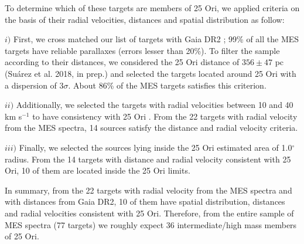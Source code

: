 \documentclass[12pt]{article}
\begin{document}
To determine which of these targets are members of 25 Ori, we applied criteria on the basis of their radial velocities, distances and spatial distribution as follow:

$i)$ First, we cross matched our list of targets with Gaia DR2 \citep{GaiaCollaboration2018}; 99\% of all the MES targets have reliable parallaxes (errors lesser than 20\%). To filter the sample according to their distances, we considered the 25 Ori distance of $356\pm47$ pc (Su\'arez et al. 2018, in prep.) and selected the targets located around 25 Ori with a dispersion of $3\sigma$. About 86\% of the MES targets satisfies this criterion. 

$ii)$ Additionally, we selected the targets with radial velocities between 10 and 40 km s$^{-1}$ to have consistency with 25 Ori \citep{Briceno2007}. From the 22 targets with radial velocity from the MES spectra, 14 sources satisfy the distance and radial velocity criteria. 

$iii)$ Finally, we selected the sources lying inside the 25 Ori estimated area of 1.0$^\circ$ radius. From the 14 targets with distance and radial velocity consistent with 25 Ori, 10 of them are located inside the 25 Ori limits.

In summary, from the 22 targets with radial velocity from the MES spectra and with distances from Gaia DR2, 10 of them have spatial distribution, distances and radial velocities consistent with 25 Ori. Therefore, from the entire sample of MES spectra (77 targets) we roughly expect 36 intermediate/high mass members of 25 Ori. %
\end{document}
